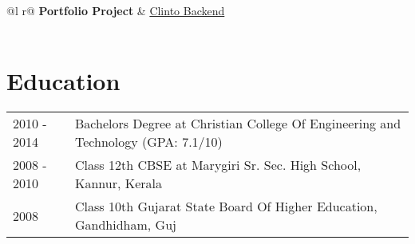 \documentclass[a4paper,12pt]{article}
\begin{document}
\begin{tabularx}{\linewidth}{ @{}l r@{} }
    \textbf{Portfolio Project} & \hfill \href{https://backend-node.jesus-christ.world/}{Clinto Backend} \\[3.75pt]
      \\
    \end{tabularx}

\section{Education}
\begin{tabularx}{\linewidth}{@{}l X@{}}	

2010 - 2014 & Bachelors Degree at Christian College Of Engineering and Technology \hfill (GPA: 7.1/10) \\ 

2008 - 2010 & Class 12th CBSE at Marygiri Sr. Sec. High School, Kannur, Kerala \hfill   \\

2008 & Class 10th Gujarat State Board Of Higher Education, Gandhidham, Guj \hfill   \\
\end{tabularx}



\vfill
{}
\end{document}
